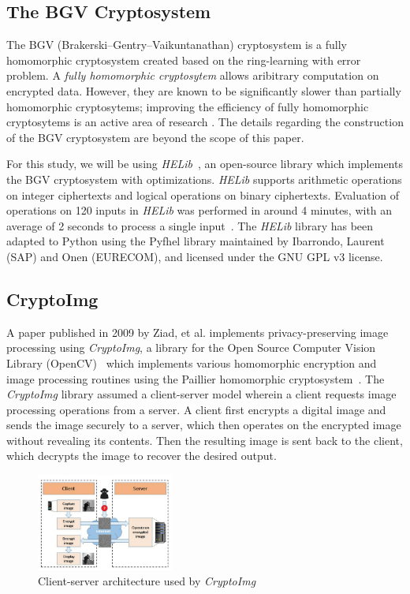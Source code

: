 \subsection{The BGV Cryptosystem}
The BGV (Brakerski--Gentry--Vaikuntanathan) cryptosystem \cite{cryptoeprint:2011:277} is a fully homomorphic cryptosystem created based on the ring-learning with error problem. A \textit{fully homomorphic cryptosytem} allows aribitrary computation on encrypted data.
However, they are known to be significantly slower than partially homomorphic cryptosytems; improving the efficiency of fully homomorphic cryptosytems is an active area of research \cite{sen_homomorphic_2013}. 
The details regarding the construction of the BGV cryptosystem are beyond the scope of this paper. 

For this study, we will be using \textit{HELib}~\cite{garay_algorithms_2014}, an open-source library which implements the BGV cryptosystem with optimizations. \textit{HELib} supports arithmetic operations on integer ciphertexts and logical operations on binary ciphertexts. Evaluation of operations on 120 inputs in \textit{HELib} was performed in around 4 minutes, with an average of 2 seconds to process a single input~\cite{hutchison_fully_2010,cryptoeprint:2011:566}. The \textit{HELib} library has been adapted to Python using the Pyfhel library \cite{pyfhel_2018} maintained by Ibarrondo, Laurent (SAP) and Onen (EURECOM), and licensed under the GNU GPL v3 license.  
\subsection{CryptoImg}
A paper published in 2009 by Ziad, et al. implements privacy-preserving image processing using \textit{CryptoImg}, a library for the Open Source Computer Vision Library (OpenCV)~\cite{bradski_opencv_2000} which implements various homomorphic encryption and image processing routines using the Paillier homomorphic cryptosystem~\cite{ziad_cryptoimg:_2016}. The \textit{CryptoImg} library assumed a client-server model wherein a client requests image processing operations from a server. A client first encrypts a digital image and sends the image securely to a server, which then operates on the encrypted image without revealing its contents. Then the resulting image is sent back to the client, which decrypts the image to recover the desired output.
\begin{figure}[!ht]
    \centering
    \includegraphics[width=0.4\textwidth]{figures/ClientServerModel.png}
    \caption{Client-server architecture used by \textit{CryptoImg} \cite{ziad_cryptoimg:_2016}}
    \label{fig:clientserver}
\end{figure}

